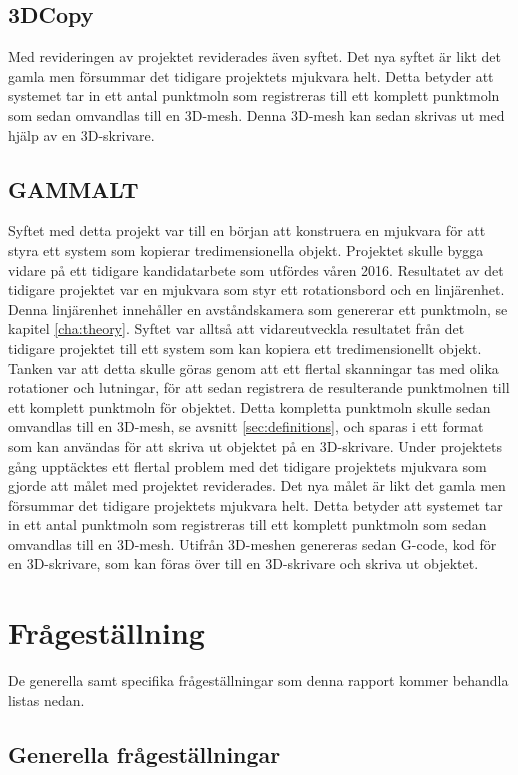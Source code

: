 \subsection{3DCopy}
Med revideringen av projektet reviderades även syftet. Det nya syftet är likt det gamla men försummar det tidigare projektets mjukvara helt. Detta betyder att systemet tar in ett antal punktmoln som registreras till ett komplett punktmoln som sedan omvandlas till en 3D-mesh. Denna 3D-mesh kan sedan skrivas ut med hjälp av en 3D-skrivare.

\subsection{GAMMALT}
Syftet med detta projekt var till en början att konstruera en mjukvara för att styra ett system som kopierar tredimensionella objekt. Projektet skulle bygga vidare på ett tidigare kandidatarbete som utfördes våren 2016. Resultatet av det tidigare projektet var en mjukvara som styr ett rotationsbord och en linjärenhet. Denna linjärenhet innehåller en avståndskamera som genererar ett punktmoln, se kapitel \ref{cha:theory}. Syftet var alltså att vidareutveckla resultatet från det tidigare projektet till ett system som kan kopiera ett tredimensionellt objekt. Tanken var att detta skulle göras genom att ett flertal skanningar tas med olika rotationer och lutningar, för att sedan registrera de resulterande punktmolnen till ett komplett punktmoln för objektet. Detta kompletta punktmoln skulle sedan omvandlas till en 3D-mesh, se avsnitt \ref{sec:definitions}, och sparas i ett format som kan användas för att skriva ut objektet på en 3D-skrivare.  Under projektets gång upptäcktes ett flertal problem med det tidigare projektets mjukvara som gjorde att målet med projektet reviderades. Det nya målet är likt det gamla men försummar det tidigare projektets mjukvara helt. Detta betyder att systemet tar in ett antal punktmoln som registreras till ett komplett punktmoln som sedan omvandlas till en 3D-mesh. Utifrån 3D-meshen genereras sedan G-code, kod för en 3D-skrivare, som kan föras över till en 3D-skrivare och skriva ut objektet.


\section{Frågeställning}
\label{sec:research-questions}
De generella samt specifika frågeställningar som denna rapport kommer behandla listas nedan.

\subsection{Generella frågeställningar}

